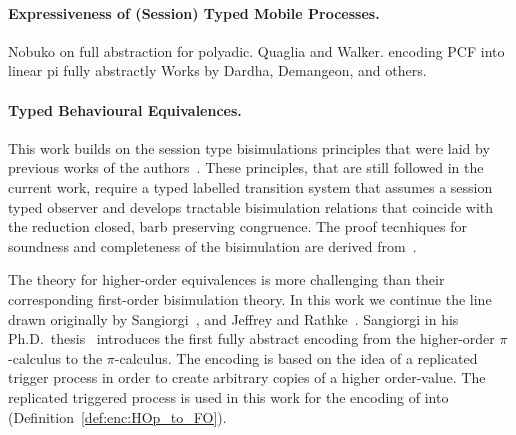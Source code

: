 \paragraph{Expressiveness of (Session) Typed Mobile Processes.}
Nobuko on full abstraction for polyadic.
Quaglia and Walker.
encoding PCF into linear pi fully abstractly
Works by Dardha, Demangeon, and others.

\paragraph{Typed Behavioural Equivalences.}
This work builds on the session type bisimulations principles
that were laid by previous works of the
authors~\cite{dkphdthesis,DBLP:conf/forte/KouzapasYH11,KY13}.
These principles, that are still followed in the current work,
require a typed labelled transition system
that assumes a session typed observer and develops
tractable bisimulation relations that coincide with
the reduction closed, barb preserving congruence. The
proof tecnhiques for soundness and completeness of the bisimulation
are derived from~\cite{Hennessy07}.

The theory for higher-order equivalences is more challenging than
their corresponding first-order bisimulation theory.
In this work we continue the line drawn originally by
Sangiorgi~\cite{San96H,SangiorgiD:expmpa},
and Jeffrey and Rathke~\cite{DBLP:journals/lmcs/JeffreyR05}.
Sangiorgi in his Ph.D.~thesis~\cite{SangiorgiD:expmpa} introduces
the first fully abstract encoding from the higher-order $\pi$-calculus to
the $\pi$-calculus.
The encoding is based on the idea of a replicated trigger process 
in order to create arbitrary copies of a higher order-value.
The replicated triggered process 
is used in this work for the encoding of \HOp into \sessp
(Definition~\ref{def:enc:HOp_to_FO}).

